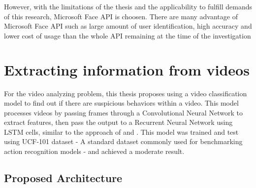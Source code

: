 However, with the limitations of the thesis and the applicability to fulfill demands of this research, Microsoft Face API is choosen. There are many advantage of Microsoft Face API such as large amount of user identification, high accuracy and lower cost of usage than the whole API remaining at the time of the investigation


\section{Extracting information from videos}
For the video analyzing problem, this thesis proposes using a video classification model to find out if there are suspicious behaviors within a video. This model processes videos by passing frames through a Convolutional Neural Network to extract features, then pass the output to a Recurrent Neural Network using LSTM cells, similar to the approach of \cite{DBLP:journals/corr/DonahueHGRVSD14} and \cite{}. This model was trained and test using UCF-101 dataset - A standard dataset commonly used for benchmarking action recognition models - and achieved a moderate result.
\subsection{Proposed Architecture}
